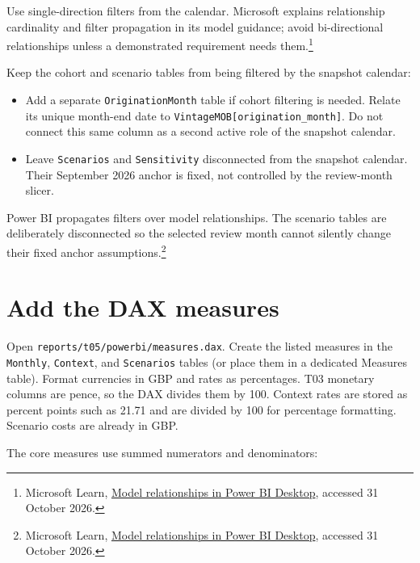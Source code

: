 \documentclass[11pt]{article}
\begin{document}
Use single-direction filters from the calendar. Microsoft explains relationship cardinality and filter propagation in its model guidance; avoid bi-directional relationships unless a demonstrated requirement needs them.\footnote{Microsoft Learn, \href{https://learn.microsoft.com/en-us/power-bi/transform-model/desktop-relationships-understand}{Model relationships in Power BI Desktop}, accessed 31 October 2026.}

Keep the cohort and scenario tables from being filtered by the snapshot calendar:

\begin{itemize}
\item Add a separate \texttt{OriginationMonth} table if cohort filtering is needed. Relate its unique month-end date to \texttt{VintageMOB[origination\_month]}. Do not connect this same column as a second active role of the snapshot calendar.
\item Leave \texttt{Scenarios} and \texttt{Sensitivity} disconnected from the snapshot calendar. Their September 2026 anchor is fixed, not controlled by the review-month slicer.
\end{itemize}

Power BI propagates filters over model relationships. The scenario tables are deliberately disconnected so the selected review month cannot silently change their fixed anchor assumptions.\footnote{Microsoft Learn, \href{https://learn.microsoft.com/en-us/power-bi/transform-model/desktop-relationships-understand}{Model relationships in Power BI Desktop}, accessed 31 October 2026.}

\section{Add the DAX measures}

Open \texttt{reports/t05/powerbi/measures.dax}. Create the listed measures in the \texttt{Monthly}, \texttt{Context}, and \texttt{Scenarios} tables (or place them in a dedicated Measures table). Format currencies in GBP and rates as percentages. T03 monetary columns are pence, so the DAX divides them by 100. Context rates are stored as percent points such as 21.71 and are divided by 100 for percentage formatting. Scenario costs are already in GBP.

The core measures use summed numerators and denominators:
\end{document}
